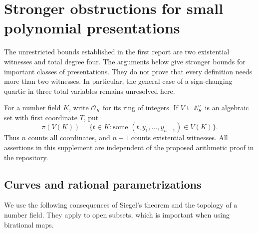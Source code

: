 
\section{Stronger obstructions for small polynomial presentations}
\label{p2lb:scope}

The unrestricted bounds established in the first report are two existential
witnesses and total degree four.  The arguments below give stronger bounds
for important classes of presentations.  They do not prove that every
definition needs more than two witnesses.  In particular, the general case
of a sign-changing quartic in three total variables remains unresolved here.

For a number field $K$, write $\mathcal O_K$ for its ring of integers.
If $V\subseteq\mathbb A^n_K$ is an algebraic set with first coordinate $T$,
put
\[
 \pi(V(K))=\{t\in K:\text{some }(t,y_1,\ldots,y_{n-1})\in V(K)\}.
\]
Thus $n$ counts all coordinates, and $n-1$ counts existential witnesses.
All assertions in this supplement are independent of the proposed
arithmetic proof in the repository.

\subsection{Curves and rational parametrizations}

We use the following consequences of Siegel's theorem and the topology
of a number field.  They apply to open subsets, which is important when
using birational maps.

